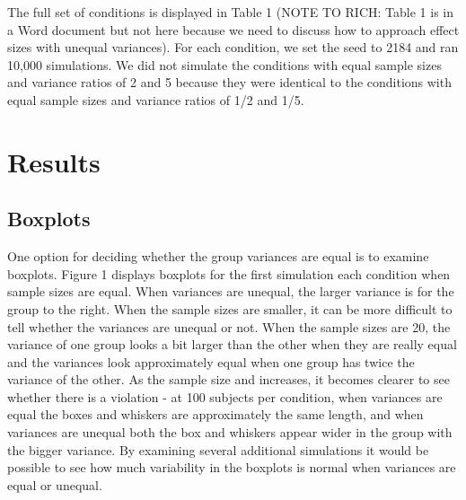 \documentclass[man,a4paper,noextraspace,apacite]{apa6}\usepackage[]{graphicx}\usepackage[]{color}
\begin{document}
    The full set of conditions is displayed in Table 1 (NOTE TO RICH: Table 1 is in a Word document but not here because we need to discuss how to approach effect sizes with unequal variances). For each condition, we set the seed to 2184 and ran 10,000 simulations. We did not simulate the conditions with equal sample sizes and variance ratios of 2 and 5 because they were identical to the conditions with equal sample sizes and variance ratios of 1/2 and 1/5. 

\section{Results}    

\subsection{Boxplots} One option for deciding whether the group variances are equal is to examine boxplots. Figure 1 displays boxplots for the first simulation each condition when sample sizes are equal. When variances are unequal, the larger variance is for the group to the right. When the sample sizes are smaller, it can be more difficult to tell whether the variances are unequal or not. When the sample sizes are 20, the variance of one group looks a bit larger than the other when they are really equal and the variances look approximately equal when one group has twice the variance of the other. As the sample size and increases, it becomes clearer to see whether there is a violation - at 100 subjects per condition, when variances are equal the boxes and whiskers are approximately the same length, and when variances are unequal both the box and whiskers appear wider in the group with the bigger variance. By examining several additional simulations it would be possible to see how much variability in the boxplots is normal when variances are equal or unequal.
   
\end{document}
